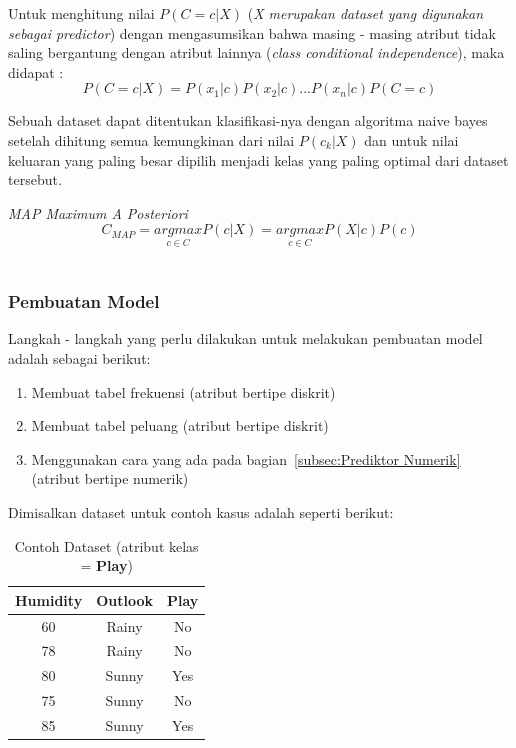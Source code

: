 Untuk menghitung nilai $P(C=c|X)$ (\textit{X merupakan dataset yang digunakan sebagai predictor}) dengan mengasumsikan bahwa masing - masing atribut tidak saling bergantung dengan atribut lainnya (\textit{class conditional independence}), maka didapat : 
\begin{equation} \label{eq:2}
	P(C=c|X) = P(x_1|c) P(x_2|c) ... P(x_n|c) P(C=c)
\end{equation}

Sebuah dataset dapat ditentukan klasifikasi-nya dengan algoritma naive bayes setelah dihitung semua kemungkinan dari nilai $P(c_k|X)$ dan untuk nilai keluaran yang paling besar dipilih menjadi kelas yang paling optimal dari dataset tersebut.

\textit{MAP Maximum A Posteriori}
		\begin{equation} \label{eq:3}
			C_{MAP} = \underset{c \in C}{ argmax } P(c|X) = \underset{c \in C}{ argmax } P(X|c) P(c)
		\end{equation} \\
		
\subsubsection{Pembuatan Model}
\label{subsubsec:Pembuatan Model}

Langkah - langkah yang perlu dilakukan untuk melakukan pembuatan model adalah sebagai berikut:
\begin{enumerate}
	\item Membuat tabel frekuensi (atribut bertipe diskrit)
	\item Membuat tabel peluang (atribut bertipe diskrit)
	\item Menggunakan cara yang ada pada bagian~\ref{subsec:Prediktor Numerik} (atribut bertipe numerik)
\end{enumerate}

Dimisalkan dataset untuk contoh kasus adalah seperti berikut:

\begin{table}[H]
	\label{tab:dataset}
	\centering
	\caption{Contoh Dataset (atribut kelas = \textbf{Play})}
	\begin{tabular}{ | c | c | c | }
	\hline
	Humidity & Outlook & \textbf{Play}\\ \hline \hline
	60 & Rainy & No\\ \hline
	78 & Rainy & No\\ \hline
	80 & Sunny & Yes\\ \hline
	75 & Sunny & No\\ \hline
	85 & Sunny & Yes \\ \hline
	\end{tabular}
\end{table}

